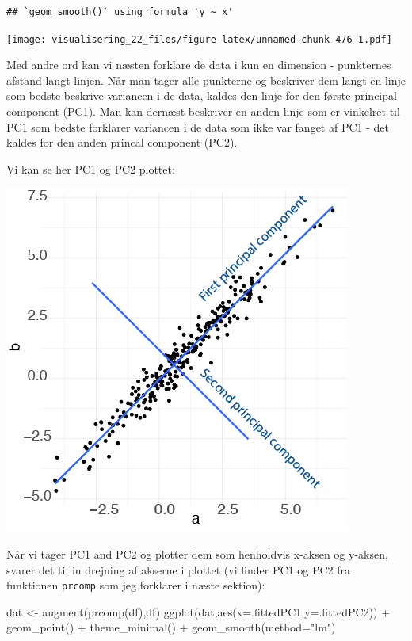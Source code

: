 \documentclass[
]{book}
\newenvironment{Shaded}{\begin{snugshade}}{\end{snugshade}}
\newcommand{\AttributeTok}[1]{\textcolor[rgb]{0.77,0.63,0.00}{#1}}
\newcommand{\FunctionTok}[1]{\textcolor[rgb]{0.00,0.00,0.00}{#1}}
\newcommand{\NormalTok}[1]{#1}
\newcommand{\OtherTok}[1]{\textcolor[rgb]{0.56,0.35,0.01}{#1}}
\newcommand{\SpecialCharTok}[1]{\textcolor[rgb]{0.00,0.00,0.00}{#1}}
\newcommand{\StringTok}[1]{\textcolor[rgb]{0.31,0.60,0.02}{#1}}
\begin{document}
\begin{verbatim}
## `geom_smooth()` using formula 'y ~ x'
\end{verbatim}

\texttt{[image: visualisering\_22\_files/figure-latex/unnamed-chunk-476-1.pdf]}

Med andre ord kan vi næsten forklare de data i kun en dimension - punkternes afstand langt linjen. Når man tager alle punkterne og beskriver dem langt en linje som bedste beskrive variancen i de data, kaldes den linje for den første principal component (PC1). Man kan dernæst beskriver en anden linje som er vinkelret til PC1 som bedste forklarer variancen i de data som ikke var fanget af PC1 - det kaldes for den anden princal component (PC2).

Vi kan se her PC1 og PC2 plottet:

\includegraphics[width=0.5\linewidth]{plots/pca_dem}

Når vi tager PC1 and PC2 og plotter dem som henholdvis x-aksen og y-aksen, svarer det til in drejning af akserne i plottet (vi finder PC1 og PC2 fra funktionen \texttt{prcomp} som jeg forklarer i næste sektion):

\begin{Shaded}
\begin{Highlighting}[]
\NormalTok{dat }\OtherTok{\textless{}{-}} \FunctionTok{augment}\NormalTok{(}\FunctionTok{prcomp}\NormalTok{(df),df)}
\FunctionTok{ggplot}\NormalTok{(dat,}\FunctionTok{aes}\NormalTok{(}\AttributeTok{x=}\NormalTok{.fittedPC1,}\AttributeTok{y=}\NormalTok{.fittedPC2)) }\SpecialCharTok{+} 
  \FunctionTok{geom\_point}\NormalTok{() }\SpecialCharTok{+} 
  \FunctionTok{theme\_minimal}\NormalTok{() }\SpecialCharTok{+} 
  \FunctionTok{geom\_smooth}\NormalTok{(}\AttributeTok{method=}\StringTok{"lm"}\NormalTok{)}
\end{Highlighting}
\end{Shaded}
\end{document}
